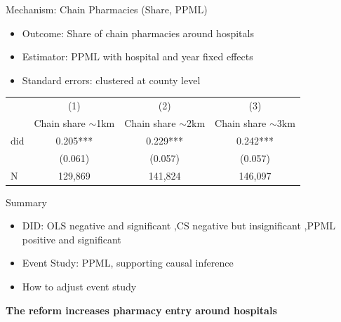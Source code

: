 \documentclass{beamer}
\begin{document}
\begin{frame}{Mechanism: Chain Pharmacies (Share, PPML)}

\begin{itemize}
    \item Outcome: Share of chain pharmacies around hospitals
    \item Estimator: PPML with hospital and year fixed effects
    \item Standard errors: clustered at county level
\end{itemize}

\vspace{0.5em}
\centering
\footnotesize
\begin{tabular}{lccc}
\hline
\hline
 & (1) & (2) & (3) \\
 & Chain share $\sim$1km & Chain share $\sim$2km & Chain share $\sim$3km \\
\hline
did & 0.205*** & 0.229*** & 0.242*** \\
    & (0.061)  & (0.057)  & (0.057)  \\
\hline
N   & 129,869  & 141,824  & 146,097  \\
\hline
\hline
\end{tabular}

\end{frame}
\begin{frame}{Summary}

\begin{itemize}
    \item DID: OLS negative and significant ,CS  negative but insignificant ,PPML positive and significant 
    \item Event Study: PPML, supporting causal inference
    \item  How to adjust event study 
\end{itemize}

\vspace{0.6cm}

\centering
\textbf{The reform increases pharmacy entry around hospitals}

\end{frame}
\end{document}
